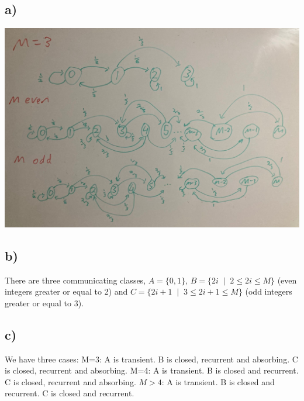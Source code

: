 \documentclass{article}
\begin{document}
\subsection*{a)}
\includegraphics[scale=0.2]{a2q4.jpeg}
\subsection*{b)}
There are three communicating classes, $A=\{0,1\}$, $B=\{2i\;\;|\;\;2\leq 2i\leq M\}$ (even integers greater or equal to 2) and $C=\{2i+1\;\;|\;\;3\leq2i+1\leq M\}$ (odd integers greater or equal to 3).
\subsection*{c)}
We have three cases:
\newline
M=3:
\newline
A is transient. B is closed, recurrent and absorbing. C is closed, recurrent and absorbing.
\newline
M=4:
\newline
A is transient. B is closed and recurrent. C is closed, recurrent and absorbing.
\newline
$M>4$:
\newline
A is transient. B is closed and recurrent. C is closed and recurrent.
\end{document}

